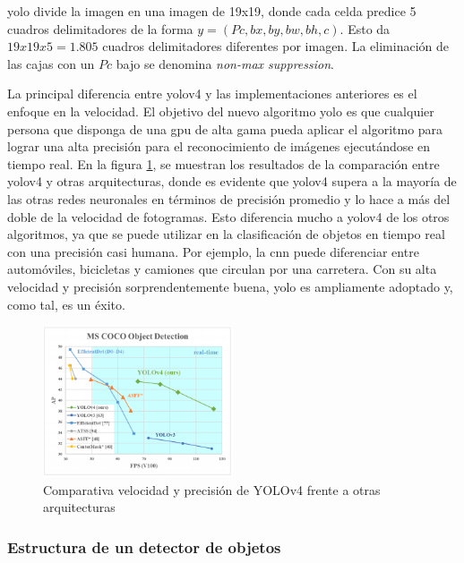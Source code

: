 \gls{yolo} divide la imagen en una imagen de 19x19, donde cada celda predice 5 cuadros delimitadores de la forma $y = (Pc, bx, by, bw, bh, c)$. Esto da $19x19x5 = 1.805$ cuadros delimitadores diferentes por imagen. La eliminación de las cajas con un $Pc$ bajo se denomina \textit{non-max suppression}.

La principal diferencia entre \gls{yolov4} y las implementaciones anteriores es el enfoque en la velocidad. El objetivo del nuevo algoritmo \gls{yolo} es que cualquier persona que disponga de una \gls{gpu} de alta gama pueda aplicar el algoritmo para lograr una alta precisión para el reconocimiento de imágenes ejecutándose en tiempo real. En la figura \ref{fig:yolov4-speed-accuracy-vs-others}, se muestran los resultados de la comparación entre \gls{yolov4} y otras arquitecturas, donde es evidente que \gls{yolov4} supera a la mayoría de las otras redes neuronales en términos de precisión promedio y lo hace a más del doble de la velocidad de fotogramas. Esto diferencia mucho a \gls{yolov4} de los otros algoritmos, ya que se puede utilizar en la clasificación de objetos en tiempo real con una precisión casi humana. Por ejemplo, la \gls{cnn} puede diferenciar entre automóviles, bicicletas y camiones que circulan por una carretera. Con su alta velocidad y precisión sorprendentemente buena, \gls{yolo} es ampliamente adoptado y, como tal, es un éxito.

\begin{figure}[ht]
\centering
\includegraphics[width=0.5\textwidth]{img/chapters/estado-del-arte/yolov4-vs-others.png}
\caption{\label{fig:yolov4-speed-accuracy-vs-others}Comparativa velocidad y precisión de YOLOv4 frente a otras arquitecturas \cite{bochkovskiy2020yolov4}}
\end{figure}

\subsubsection*{Estructura de un detector de objetos}
\label{subsubsec:estructura-detector-objetos}

